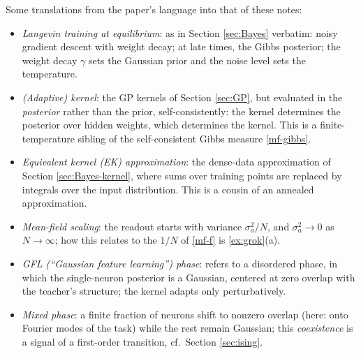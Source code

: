 \documentclass[11pt]{article}
\begin{document}
\begin{callout}[note]
Some translations from the paper's language into that of these notes:
\begin{itemize}
    \item \emph{Langevin training at equilibrium}: as in Section \ref{sec:Bayes} verbatim: noisy gradient descent with weight decay; at late times, the Gibbs posterior; the weight decay $\gamma$ sets the Gaussian prior and the noise level sets the temperature.
    \item \emph{(Adaptive) kernel}: the GP kernels of Section \ref{sec:GP}, but evaluated in the \emph{posterior} rather than the prior, self-consistently: the kernel determines the posterior over hidden weights, which determines the kernel. This is a finite-temperature sibling of the self-consistent Gibbs measure \eqref{mf-gibbs}.
    \item \emph{Equivalent kernel (EK) approximation}: the dense-data approximation of Section \ref{sec:Bayes-kernel}, where sums over training points are replaced by integrals over the input distribution. This is a cousin of an annealed approximation.
    \item \emph{Mean-field scaling}: the readout starts with variance $\sigma_a^2/N$, and $\sigma_a^2\to0$ as $N\to\infty$; how this relates to the $1/N$ of \eqref{mf-f} is \cref{ex:grok}(a).
    \item \emph{GFL (``Gaussian feature learning'') phase}: refers to a disordered phase, in which the single-neuron posterior is a Gaussian, centered at zero overlap with the teacher's structure; the kernel adapts only perturbatively.
    \item \emph{Mixed phase}: a finite fraction of neurons shift to nonzero overlap (here: onto Fourier modes of the task) while the rest remain Gaussian; this \emph{coexistence} is a signal of a first-order transition, cf.\ Section \ref{sec:ising}.
\end{itemize}
\end{callout}
\end{document}
